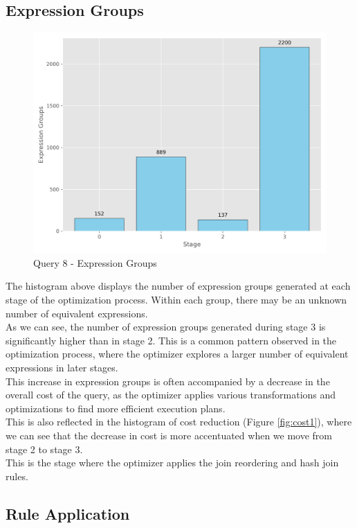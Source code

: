 \documentclass[a4paper,12pt]{scrreprt}
\begin{document}
\subsection{Expression Groups}

\begin{figure}[H]
    \centering
    \includegraphics[width=0.80\linewidth]{img/expression_groups/q8_expression_groups.png}
    \caption{Query 8 - Expression Groups}
    \label{fig:exprgroups8}
\end{figure}
The histogram above displays the number of expression groups generated at each stage of the optimization process. Within each group, there may be an unknown number of equivalent expressions. \\
As we can see, the number of expression groups generated during stage 3 is significantly higher than in stage 2. This is a common pattern observed in the optimization process, where the optimizer explores a larger number of equivalent expressions in later stages. \\
This increase in expression groups is often accompanied by a decrease in the overall cost of the query, as the optimizer applies various transformations and optimizations to find more efficient execution plans. \\
This is also reflected in the histogram of cost reduction (Figure \ref{fig:cost1}), where we can see that the decrease in cost is more accentuated when we move from stage 2 to stage 3. \\
This is the stage where the optimizer applies the join reordering and hash join rules. \\

\subsection{Rule Application}
\end{document}
